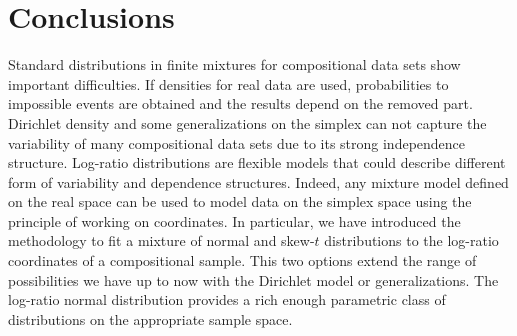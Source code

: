 \documentclass[10pt, a4paper]{article}
\begin{document}
% 
% 


\section{Conclusions}
\label{conclusion_section}
Standard distributions in finite mixtures for compositional data sets show important difficulties. If densities for real data are used, probabilities to impossible events are obtained and the results depend on the removed part. Dirichlet density and some generalizations on the simplex can not capture the variability of many compositional data sets due to its strong independence structure. Log-ratio distributions are flexible models that could describe different form of variability and dependence structures. Indeed, any mixture model defined on the real space can be used to model data on the simplex space using the principle of working on coordinates. In particular, we have introduced the methodology to fit a mixture of normal and skew-$t$ distributions to the log-ratio coordinates of a compositional sample. This two options extend the range of possibilities we have up to now with the Dirichlet model or generalizations. The log-ratio normal distribution provides a rich enough parametric class of distributions on the appropriate sample space. 
\end{document}
